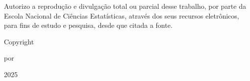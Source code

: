 \documentclass[12pt,openright,oneside,a4paper,chapter=TITLE,english,french,spanish,brazil]{abntex2}
\begin{document}
\begin{fichacatalografica}

\begin{flushleft}
Autorizo a reprodução e divulgação total ou parcial desse  
trabalho, por parte da Escola Nacional de Ciências Estatísticas,  
através dos seus recursos eletrônicos, para fins de estudo e  
pesquisa, desde que citada a fonte.  
\end{flushleft}

    \vspace*{\fill}\vspace*{\fill}
    
\begin{center}
Copyright \par por \par \imprimirautor \par 2025
\end{center}




	\sffamily
	\vspace*{\fill}					%
	\begin{center}					%
	\end{center}
\end{fichacatalografica}
\end{document}
